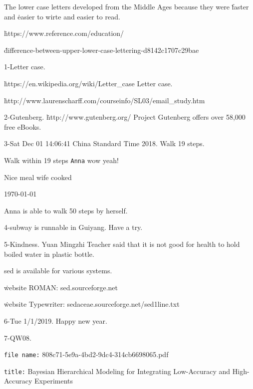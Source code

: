 The lower case letters developed from the Middle Ages because they were \.{faster} and \.{easier} to wirte and easier to read.

\.{https://www.reference.com/education/}

\.{difference-between-upper-lower-case-lettering-d8142c1707c29bae}

\fi

1-Letter case.

\.{https://en.wikipedia.org/wiki/Letter\_case}
Letter case.

\.{http://www.laurenscharff.com/courseinfo/SL03/email\_study.htm}

\fi

2-Gutenberg.
\.{http://www.gutenberg.org/}
Project Gutenberg offers over 58,000 free eBooks.

\fi

3-Sat Dec 01 14:06:41 China Standard Time 2018. Walk 19 steps.

\vfill

\mainfont Walk within 19 steps {\tt Anna} wow yeah!\hfill

\centerline{\titlefont Nice {\ttitlefont meal} wife cooked}

\centerline{\today} \vfill

Anna is able to walk 50 steps by herself.

\fi

4-subway is runnable in Guiyang.
Have a try.

\smallskip{}

\fi

5-Kindness. Yuan Mingzhi Teacher said that it is not good for health to hold boiled water in plastic bottle.

sed is available for various systems.

\.{website ROMAN}: sed.sourceforge.net

\.{website Typewriter}: sedaceae.sourceforge.net/sed1line.txt

\fi

6-Tue 1/1/2019. Happy new year.

\fi

7-QW08.

{\tt file name:} 808c71-5e9a-4bd2-9dc4-314cb6698065.pdf

{\tt title:} Bayesian Hierarchical Modeling for Integrating Low-Accuracy and High-Accuracy Experiments

